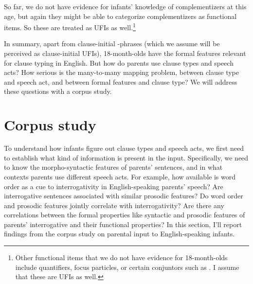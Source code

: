  So far, we do not have evidence for infants' knowledge of complementizers at this age, but again they might be able to categorize complementizers as functional items. So these are treated as UFIs as well.\footnote{ Other functional items that we do not have evidence for 18-month-olds include quantifiers, focus particles, or certain conjuntors such as . I assume that these are UFIs as well. } %





In summary, apart from clause-initial \twh-phrases (which we assume will be perceived as clause-initial UFIs), 18-month-olds have the formal features relevant for clause typing in English. But how do parents use clause types and speech acts? How serious is the many-to-many mapping problem, between clause type and speech act, and between formal features and clause type? We will address these questions with a corpus study. %

\section{Corpus study}
\label{sec:engcl:corpus}
To understand how infants figure out clause types and speech acts, we first need to establish what kind of information is present in the input. Specifically, we need to know the morpho-syntactic features of parents’ sentences, and in what contexts parents use different speech acts. For example, how available is word order as a cue to interrogativity in English-speaking parents’ speech? Are interrogative sentences associated with similar prosodic features? Do word order and prosodic features jointly correlate with interrogativity? Are there any correlations between the formal properties like syntactic and prosodic features of parents’ interrogative and their functional properties? In this section, I’ll report findings from the corpus study on parental input to English-speaking infants. 


